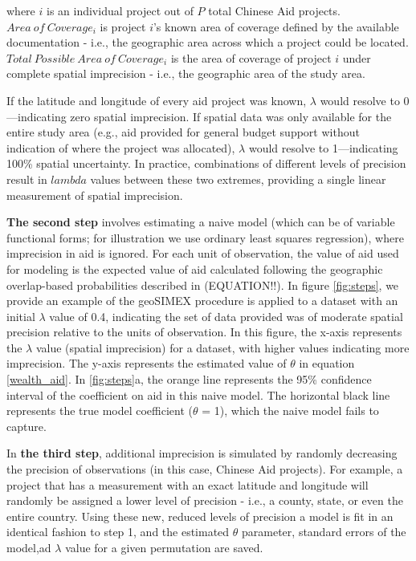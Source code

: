 \noindent where $i$ is an individual project out of $P$ total Chinese Aid projects. $Area \ of \ Coverage_i$ is project $i$'s known area of coverage defined by the available documentation - i.e., the geographic area across which a project could be located. 
$Total \ Possible \ Area \ of \ Coverage_i$ is the area of coverage of project $i$ under complete spatial imprecision - i.e., the geographic area of the study area.
\par
If the latitude and longitude of every aid project was known, $\lambda$ would resolve to 0---indicating zero spatial imprecision. 
If spatial data was only available for the entire study area (e.g., aid provided for general budget support without indication of where the project was allocated), $\lambda$ would resolve to 1---indicating 100\% spatial uncertainty. 
In practice, combinations of different levels of precision result in $lambda$ values between these two extremes, providing a single linear measurement of spatial imprecision.
\par
\textbf{The second step} involves estimating a naive model (which can be of variable functional forms; for illustration we use ordinary least squares regression), where imprecision in aid is ignored. 
For each unit of observation, the value of aid used for modeling is the expected value of aid calculated following the geographic overlap-based probabilities described in (EQUATION!!).
In figure \ref{fig:steps}, we provide an example of the geoSIMEX procedure is applied to a dataset with an initial $\lambda$ value of 0.4, indicating the set of data provided was of moderate spatial precision relative to the units of observation.
In this figure, the x-axis represents the $\lambda$ value (spatial imprecision) for a dataset, with higher values indicating more imprecision.
The y-axis represents the estimated value of $\theta$ in equation \ref{wealth_aid}.
In \ref{fig:steps}a, the orange line represents the 95\% confidence interval of the coefficient on aid in this naive model. 
The horizontal black line represents the true model coefficient ($\theta$ = 1), which the naive model fails to capture.
\par 
In \textbf{the third step}, additional imprecision is simulated by randomly decreasing the precision of observations (in this case, Chinese Aid projects). 
For example, a project that has a measurement with an exact latitude and longitude will randomly be assigned a lower level of precision - i.e., a county, state, or even the entire country. 
Using these new, reduced levels of precision a model is fit in an identical fashion to step 1, and the estimated $\theta$ parameter, standard errors of the model,ad $\lambda$ value for a given permutation are saved.
